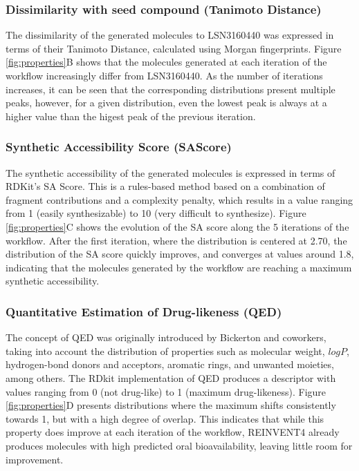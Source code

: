 \subsubsection{Dissimilarity with seed compound (Tanimoto Distance)}
The dissimilarity of the generated molecules to LSN3160440 was expressed in terms of their Tanimoto Distance, calculated using Morgan fingerprints\cite{Raymond2002EffectivenessDatabases}. Figure \ref{fig:properties}B shows that the molecules generated at each iteration of the workflow increasingly differ from LSN3160440. As the number of iterations increases, it can be seen that the corresponding distributions present multiple peaks, however, for a given distribution, even the lowest peak is always at a higher value than the higest peak of the previous iteration.

\subsubsection{Synthetic Accessibility Score (SAScore)}
The synthetic accessibility of the generated molecules is expressed in terms of RDKit's SA Score\cite{Ertl2009EstimationContributions}. This is a rules-based method based on a combination of fragment contributions and a complexity penalty, which results in a value ranging from 1 (easily synthesizable) to 10 (very difficult to synthesize). Figure \ref{fig:properties}C shows the evolution of the SA score along the 5 iterations of the workflow. After the first iteration, where the distribution is centered at 2.70, the distribution of the SA score quickly improves, and converges at values around 1.8, indicating that the molecules generated by the workflow are reaching a maximum synthetic accessibility.

\subsubsection{Quantitative Estimation of Drug-likeness (QED)}
The concept of QED was originally introduced by Bickerton and coworkers\cite{Bickerton2012QuantifyingDrugs,Wildman1999PredictionContributions}, taking into account the distribution of properties such as molecular weight, $logP$, hydrogen-bond donors and acceptors, aromatic rings, and unwanted moieties, among others. The RDkit implementation of QED produces a descriptor with values ranging from 0 (not drug-like) to 1 (maximum drug-likeness). Figure \ref{fig:properties}D presents distributions where the maximum shifts consistently towards 1, but with a high degree of overlap. This indicates that while this property does improve at each iteration of the workflow, REINVENT4 already produces molecules with high predicted oral bioavailability, leaving little room for improvement. 

